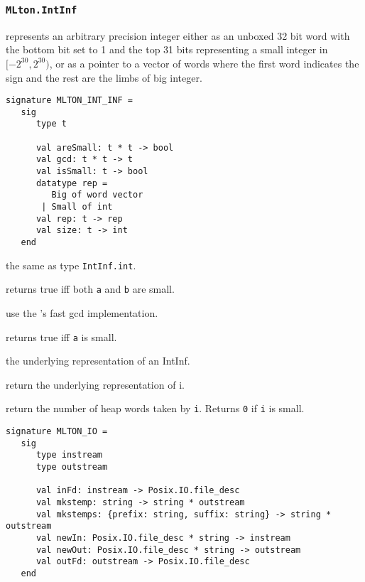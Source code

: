 \subsubsection{{\tt MLton.IntInf}}

{\mlton} represents an arbitrary precision integer either as an
unboxed 32 bit word with the bottom bit set to 1 and the top 31 bits
representing a small integer in $[-2^{30}, 2^{30})$, or as a pointer
to a vector of words where the first word indicates the sign and the
rest are the limbs of {\gmp} big integer.
\begin{verbatim}
signature MLTON_INT_INF =
   sig
      type t

      val areSmall: t * t -> bool
      val gcd: t * t -> t
      val isSmall: t -> bool
      datatype rep =
         Big of word vector
       | Small of int
      val rep: t -> rep
      val size: t -> int
   end
\end{verbatim}

\begin{description}

the same as type {\tt IntInf.int}.

returns true iff both {\tt a} and {\tt b} are small.

use the {\gmp}'s fast gcd implementation.

returns true iff {\tt a} is small.

the underlying representation of an IntInf.

return the underlying representation of i.

return the number of heap words taken by {\tt i}.  Returns {\tt 0} if
{\tt i} is small.

\end{description}


\begin{verbatim}
signature MLTON_IO =
   sig
      type instream
      type outstream

      val inFd: instream -> Posix.IO.file_desc
      val mkstemp: string -> string * outstream
      val mkstemps: {prefix: string, suffix: string} -> string * outstream
      val newIn: Posix.IO.file_desc * string -> instream
      val newOut: Posix.IO.file_desc * string -> outstream
      val outFd: outstream -> Posix.IO.file_desc
   end
\end{verbatim}

